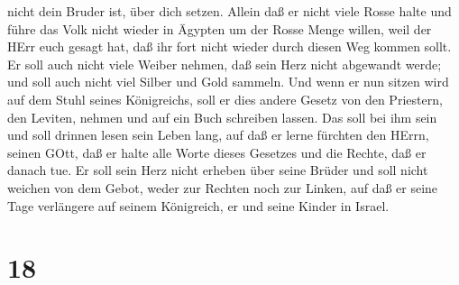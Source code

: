 nicht dein Bruder ist, über dich setzen.  Allein daß er
nicht viele Rosse halte und führe das Volk nicht wieder in Ägypten um
der Rosse Menge willen, weil der HErr euch gesagt hat, daß ihr fort
nicht wieder durch diesen Weg kommen sollt.  Er soll auch
nicht viele Weiber nehmen, daß sein Herz nicht abgewandt werde; und soll
auch nicht viel Silber und Gold sammeln.  Und wenn er nun
sitzen wird auf dem Stuhl seines Königreichs, soll er dies andere Gesetz
von den Priestern, den Leviten, nehmen und auf ein Buch schreiben
lassen.  Das soll bei ihm sein und soll drinnen lesen sein
Leben lang, auf daß er lerne fürchten den HErrn, seinen GOtt, daß er
halte alle Worte dieses Gesetzes und die Rechte, daß er danach tue.
 Er soll sein Herz nicht erheben über seine Brüder und soll
nicht weichen von dem Gebot, weder zur Rechten noch zur Linken, auf daß
er seine Tage verlängere auf seinem Königreich, er und seine Kinder in
Israel.

\hypertarget{section-17}{%
\section{18}\label{section-17}}

